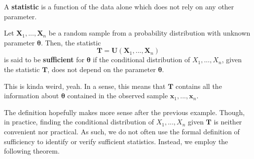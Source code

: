 A \textbf{statistic} is a function of the data alone which does not rely on any other parameter. 


\begin{definition}[Sufficient]\label{defn:sufficient}
    Let \(\bm{X}_1,...,\bm{X}_n\) be a random sample from a probability distribution with unknown parameter \(\bm{\theta}\). 
    Then, the statistic
    \[\bm{T} = \bm{U}(\bm{X}_1,...,\bm{X}_n)\]
    is said to be \textbf{sufficient} for \(\bm{\theta}\) if the conditional distribution of \(X_1,...,X_n\), 
    given the statistic \(\bm{T}\), does not depend on the parameter \(\bm{\theta}\). 
\end{definition}

This is kinda weird, yeah. In a sense, this means that \(\bm{T}\) contains 
all the information about \(\bm{\theta}\) contained in the observed sample 
\(\bm{x}_1,...,\bm{x}_n\). 


    

\bigskip

The definition hopefully makes more sense after the previous example. 
Though, in practice, finding the conditional distribution 
of \(X_1,...,X_n\) given \(\bm{T}\) is neither convenient nor practical. 
As such, we do not often use the formal definition of sufficiency 
to identify or verify sufficient statistics. Instead, we employ 
the following theorem.


